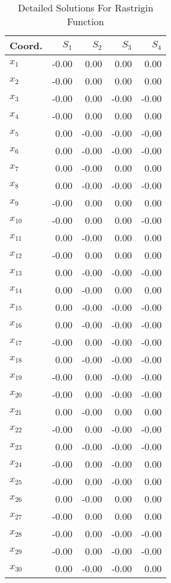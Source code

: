 \begin{table}
\centering
\caption{Detailed Solutions For Rastrigin Function}
\label{detailedsolutions:rastrigin30d}
\begin{tabular}{lrrrr}
\toprule
  Coord. &  $S_{1}$ &  $S_{2}$ &  $S_{3}$ &  $S_{4}$ \\
\midrule
 $x_{1}$ &    -0.00 &     0.00 &     0.00 &     0.00 \\
 $x_{2}$ &    -0.00 &     0.00 &     0.00 &     0.00 \\
 $x_{3}$ &    -0.00 &     0.00 &    -0.00 &    -0.00 \\
 $x_{4}$ &    -0.00 &     0.00 &     0.00 &     0.00 \\
 $x_{5}$ &     0.00 &    -0.00 &    -0.00 &    -0.00 \\
 $x_{6}$ &     0.00 &    -0.00 &    -0.00 &    -0.00 \\
 $x_{7}$ &     0.00 &    -0.00 &     0.00 &     0.00 \\
 $x_{8}$ &     0.00 &    -0.00 &    -0.00 &    -0.00 \\
 $x_{9}$ &    -0.00 &     0.00 &     0.00 &     0.00 \\
$x_{10}$ &    -0.00 &     0.00 &     0.00 &    -0.00 \\
$x_{11}$ &     0.00 &    -0.00 &     0.00 &     0.00 \\
$x_{12}$ &    -0.00 &     0.00 &     0.00 &     0.00 \\
$x_{13}$ &     0.00 &    -0.00 &    -0.00 &    -0.00 \\
$x_{14}$ &     0.00 &    -0.00 &     0.00 &     0.00 \\
$x_{15}$ &     0.00 &    -0.00 &    -0.00 &    -0.00 \\
$x_{16}$ &     0.00 &    -0.00 &    -0.00 &    -0.00 \\
$x_{17}$ &    -0.00 &     0.00 &    -0.00 &    -0.00 \\
$x_{18}$ &     0.00 &    -0.00 &    -0.00 &    -0.00 \\
$x_{19}$ &    -0.00 &     0.00 &    -0.00 &    -0.00 \\
$x_{20}$ &    -0.00 &     0.00 &    -0.00 &    -0.00 \\
$x_{21}$ &     0.00 &    -0.00 &     0.00 &     0.00 \\
$x_{22}$ &    -0.00 &     0.00 &    -0.00 &    -0.00 \\
$x_{23}$ &     0.00 &    -0.00 &    -0.00 &    -0.00 \\
$x_{24}$ &    -0.00 &     0.00 &    -0.00 &     0.00 \\
$x_{25}$ &    -0.00 &     0.00 &    -0.00 &     0.00 \\
$x_{26}$ &     0.00 &    -0.00 &     0.00 &     0.00 \\
$x_{27}$ &    -0.00 &     0.00 &     0.00 &     0.00 \\
$x_{28}$ &    -0.00 &     0.00 &    -0.00 &    -0.00 \\
$x_{29}$ &    -0.00 &     0.00 &    -0.00 &    -0.00 \\
$x_{30}$ &     0.00 &    -0.00 &    -0.00 &     0.00 \\
\bottomrule
\end{tabular}
\end{table}
